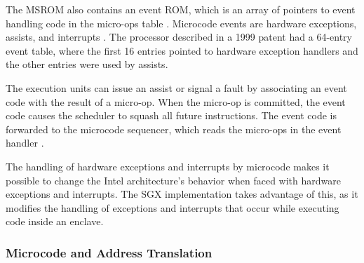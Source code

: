
The MSROM also contains an event ROM, which is an array of pointers to event
handling code in the micro-ops table \cite{intel1999events}. Microcode events
are hardware exceptions, assists, and interrupts \cite{intel1997events,
intel1999exceptions}. The processor described in a 1999 patent
\cite{intel1999events} had a 64-entry event table, where the first 16 entries
pointed to hardware exception handlers and the other entries were used by
assists.


The execution units can issue an assist or signal a fault by associating an
event code with the result of a micro-op. When the micro-op is committed, the
event code causes the scheduler to squash all future instructions. The event
code is forwarded to the microcode sequencer, which reads the micro-ops in the
event handler \cite{intel1997events, intel1999exceptions}.

The handling of hardware exceptions and interrupts by microcode makes it
possible to change the Intel architecture's behavior when faced with hardware
exceptions and interrupts. The SGX implementation takes advantage of this, as
it modifies the handling of exceptions and interrupts that occur while
executing code inside an enclave.


\subsubsection{Microcode and Address Translation}

